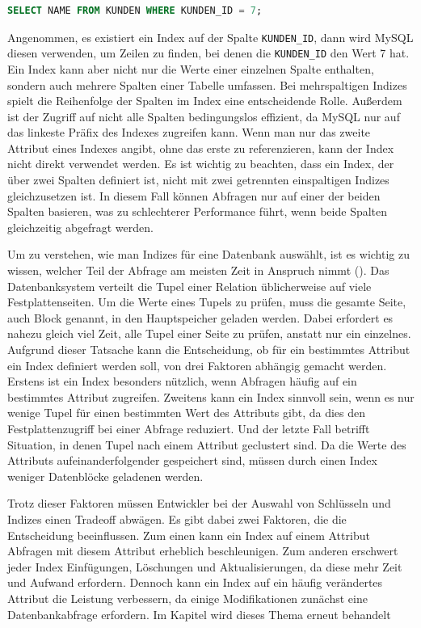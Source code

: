 \begin{lstlisting}[language=SQL]
SELECT NAME FROM KUNDEN WHERE KUNDEN_ID = 7;
\end{lstlisting}
\vspace{-4pt}

Angenommen, es existiert ein Index auf der Spalte \texttt{KUNDEN\_ID}, dann wird MySQL diesen verwenden, um Zeilen zu finden, bei denen die \texttt{KUNDEN\_ID} den Wert 7 hat.
Ein Index kann aber nicht nur die Werte einer einzelnen Spalte enthalten, sondern auch mehrere Spalten einer Tabelle umfassen.
Bei mehrspaltigen Indizes spielt die Reihenfolge der Spalten im Index eine entscheidende Rolle.
Außerdem ist der Zugriff auf nicht alle Spalten bedingungslos effizient, da MySQL nur auf das linkeste Präfix des Indexes zugreifen kann.
Wenn man nur das zweite Attribut eines Indexes angibt, ohne das erste zu referenzieren, kann der Index nicht direkt verwendet werden.
Es ist wichtig zu beachten, dass ein Index, der über zwei Spalten definiert ist, nicht mit zwei getrennten einspaltigen Indizes gleichzusetzen ist.
In diesem Fall können Abfragen nur auf einer der beiden Spalten basieren, was zu schlechterer Performance führt, wenn beide Spalten gleichzeitig abgefragt werden.

Um zu verstehen, wie man Indizes für eine Datenbank auswählt, ist es wichtig zu wissen, welcher Teil der Abfrage am meisten Zeit in Anspruch nimmt (\cite[S. 350--353]{garcia2008database}).
Das Datenbanksystem verteilt die Tupel einer Relation üblicherweise auf viele Festplattenseiten.
Um die Werte eines Tupels zu prüfen, muss die gesamte Seite, auch Block genannt, in den Hauptspeicher geladen werden.
Dabei erfordert es nahezu gleich viel Zeit, alle Tupel einer Seite zu prüfen, anstatt nur ein einzelnes.
Aufgrund dieser Tatsache kann die Entscheidung, ob für ein bestimmtes Attribut ein Index definiert werden soll, von drei Faktoren abhängig gemacht werden.
Erstens ist ein Index besonders nützlich, wenn Abfragen häufig auf ein bestimmtes Attribut zugreifen.
Zweitens kann ein Index sinnvoll sein, wenn es nur wenige Tupel für einen bestimmten Wert des Attributs gibt, da dies den Festplattenzugriff bei einer Abfrage reduziert.
Und der letzte Fall betrifft Situation, in denen Tupel nach einem Attribut geclustert sind.
Da die Werte des Attributs aufeinanderfolgender gespeichert sind, müssen durch einen Index weniger Datenblöcke geladenen werden.

Trotz dieser Faktoren müssen Entwickler bei der Auswahl von Schlüsseln und Indizes einen Tradeoff abwägen.
Es gibt dabei zwei Faktoren, die die Entscheidung beeinflussen.
Zum einen kann ein Index auf einem Attribut Abfragen mit diesem Attribut erheblich beschleunigen.
Zum anderen erschwert jeder Index Einfügungen, Löschungen und Aktualisierungen, da diese mehr Zeit und Aufwand erfordern.
Dennoch kann ein Index auf ein häufig verändertes Attribut die Leistung verbessern, da einige Modifikationen zunächst eine Datenbankabfrage erfordern.
Im Kapitel  wird dieses Thema erneut behandelt

